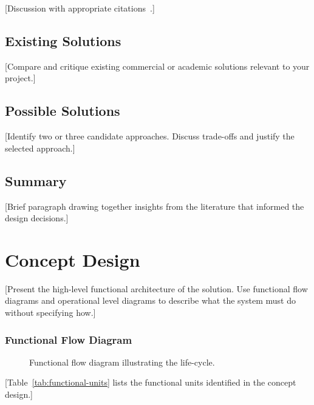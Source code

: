 \documentclass[12pt, a4paper]{report}
\begin{document}
[Discussion with appropriate citations~\cite{ref2}.]

\section{Existing Solutions}
\label{sec:existing-solutions}

[Compare and critique existing commercial or academic solutions
relevant to your project.]

\section{Possible Solutions}
\label{sec:possible-solutions}

[Identify two or three candidate approaches. Discuss trade-offs and
justify the selected approach.]

\section{Summary}
\label{sec:lit-summary}

[Brief paragraph drawing together insights from the literature that
informed the design decisions.]

\chapter{Concept Design}
\label{ch:concept}

[Present the high-level functional architecture of the solution.
Use functional flow diagrams and operational level diagrams to
describe what the system must do without specifying how.]

\subsection*{Functional Flow Diagram}

\begin{figure}[H]
    \centering
    \caption{Functional flow diagram illustrating the life-cycle.}
    \label{fig:functional-flow}
\end{figure}

[Table~\ref{tab:functional-units} lists the functional units
identified in the concept design.]
\end{document}
